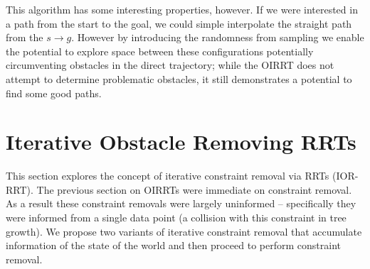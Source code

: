 This algorithm has some interesting properties, however. If we were interested in a path from the start to the goal, we could simple interpolate the straight path from the $s \rightarrow g$. However by introducing the randomness from sampling we enable the potential to explore space between these configurations potentially circumventing obstacles in the direct trajectory; while the OIRRT does not attempt to determine problematic obstacles, it still demonstrates a potential to find some good paths.

\section{Iterative Obstacle Removing RRTs}
This section explores the concept of iterative constraint removal via RRTs (IOR-RRT). The previous section on OIRRTs were immediate on constraint removal. As a result these constraint removals were largely uninformed -- specifically they were informed from a single data point (a collision with this constraint in tree growth). We propose two variants of iterative constraint removal that accumulate information of the state of the world and then proceed to perform constraint removal.

